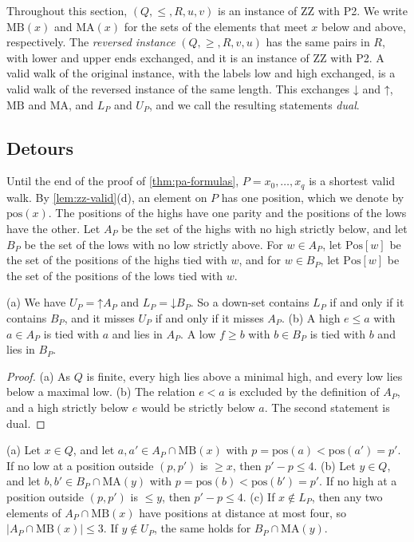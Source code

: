 \documentclass[pdflatex,sn-mathphys-num]{sn-jnl}%
\theoremstyle{thmstyleone}%
\theoremstyle{thmstyletwo}%
\theoremstyle{thmstylethree}%
\newcommand{\dn}{\mathord{\downarrow}}%
\newcommand{\upp}{\mathord{\uparrow}}%
\newcommand{\pos}{\mathrm{pos}}%
\newcommand{\MB}{\mathrm{MB}}%
\newcommand{\MA}{\mathrm{MA}}%
\newcommand{\Pos}{\mathrm{Pos}}%
\begin{document}
Throughout this section, $(Q, \leq, R, u, v)$ is an instance of ZZ with P2.
We write $\MB(x)$ and $\MA(x)$ for the sets of the elements that meet $x$ below and above, respectively.
The \emph{reversed instance} $(Q, \geq, R, v, u)$ has the same pairs in $R$, with lower and upper ends exchanged, and it is an instance of ZZ with P2.
A valid walk of the original instance, with the labels low and high exchanged, is a valid walk of the reversed instance of the same length.
This exchanges $\dn$ and $\upp$, $\MB$ and $\MA$, and $L_P$ and $U_P$, and we call the resulting statements \emph{dual}.

\subsection{Detours}
\label{sec:pa-detours}

Until the end of the proof of \cref{thm:pa-formulas}, $P = x_0, \dots, x_q$ is a shortest valid walk.
By \cref{lem:zz-valid}(d), an element on $P$ has one position, which we denote by $\pos(x)$.
The positions of the highs have one parity and the positions of the lows have the other.
Let $A_P$ be the set of the highs with no high strictly below, and let $B_P$ be the set of the lows with no low strictly above.
For $w \in A_P$, let $\Pos[w]$ be the set of the positions of the highs tied with $w$, and for $w \in B_P$, let $\Pos[w]$ be the set of the positions of the lows tied with $w$.

\begin{lemma}
\label{lem:pa-basic}
(a) We have $U_P = \upp A_P$ and $L_P = \dn B_P$.
So a down-set contains $L_P$ if and only if it contains $B_P$, and it misses $U_P$ if and only if it misses $A_P$.
(b) A high $e \leq a$ with $a \in A_P$ is tied with $a$ and lies in $A_P$.
A low $f \geq b$ with $b \in B_P$ is tied with $b$ and lies in $B_P$.
\end{lemma}

\begin{proof}
(a) As $Q$ is finite, every high lies above a minimal high, and every low lies below a maximal low.
(b) The relation $e < a$ is excluded by the definition of $A_P$, and a high strictly below $e$ would be strictly below $a$.
The second statement is dual.
\end{proof}

\begin{lemma}
\label{lem:pa-one}
(a) Let $x \in Q$, and let $a, a' \in A_P \cap \MB(x)$ with $p = \pos(a) < \pos(a') = p'$.
If no low at a position outside $(p, p')$ is $\geq x$, then $p' - p \leq 4$.
(b) Let $y \in Q$, and let $b, b' \in B_P \cap \MA(y)$ with $p = \pos(b) < \pos(b') = p'$.
If no high at a position outside $(p, p')$ is $\leq y$, then $p' - p \leq 4$.
(c) If $x \notin L_P$, then any two elements of $A_P \cap \MB(x)$ have positions at distance at most four, so $|A_P \cap \MB(x)| \leq 3$.
If $y \notin U_P$, the same holds for $B_P \cap \MA(y)$.
\end{lemma}
\end{document}

